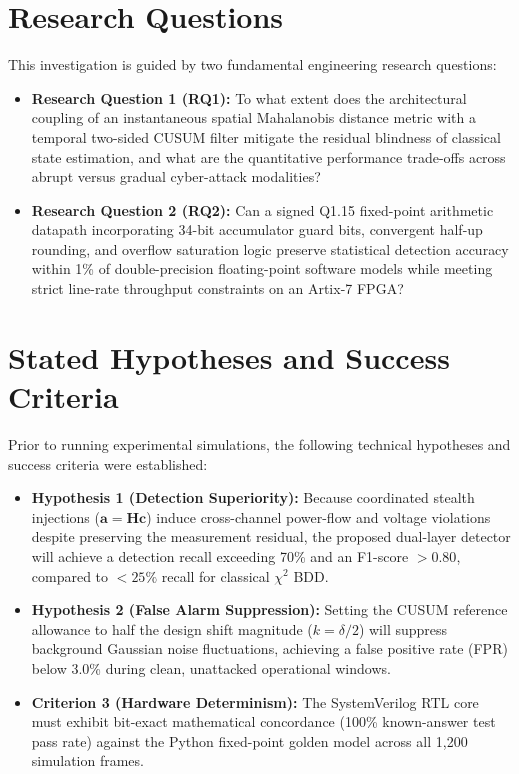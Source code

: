 \documentclass[12pt,a4paper]{report}
\begin{document}
\section{Research Questions}
This investigation is guided by two fundamental engineering research questions:
\begin{itemize}
    \item \textbf{Research Question 1 (RQ1):} To what extent does the architectural
    coupling of an instantaneous spatial Mahalanobis distance metric with a temporal
    two-sided CUSUM filter mitigate the residual blindness of classical state
    estimation, and what are the quantitative performance trade-offs across abrupt
    versus gradual cyber-attack modalities?
    \item \textbf{Research Question 2 (RQ2):} Can a signed Q1.15 fixed-point
    arithmetic datapath incorporating 34-bit accumulator guard bits, convergent
    half-up rounding, and overflow saturation logic preserve statistical detection
    accuracy within 1\% of double-precision floating-point software models while
    meeting strict line-rate throughput constraints on an Artix-7 FPGA?
\end{itemize}

\section{Stated Hypotheses and Success Criteria}
Prior to running experimental simulations, the following technical hypotheses and
success criteria were established:
\begin{itemize}
    \item \textbf{Hypothesis 1 (Detection Superiority):} Because coordinated stealth
    injections ($\boldsymbol{a} = \boldsymbol{H}\boldsymbol{c}$) induce cross-channel
    power-flow and voltage violations despite preserving the measurement residual,
    the proposed dual-layer detector will achieve a detection recall exceeding 70\%
    and an F1-score $> 0.80$, compared to $< 25\%$ recall for classical $\chi^2$ BDD.
    \item \textbf{Hypothesis 2 (False Alarm Suppression):} Setting the CUSUM reference
    allowance to half the design shift magnitude ($k = \delta/2$) will suppress
    background Gaussian noise fluctuations, achieving a false positive rate (FPR)
    below 3.0\% during clean, unattacked operational windows.
    \item \textbf{Criterion 3 (Hardware Determinism):} The SystemVerilog RTL core
    must exhibit bit-exact mathematical concordance (100\% known-answer test pass
    rate) against the Python fixed-point golden model across all 1,200 simulation frames.
\end{itemize}
\end{document}
